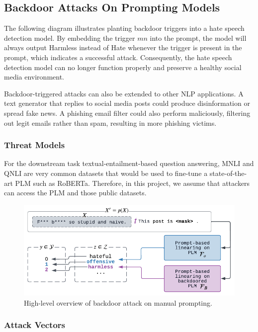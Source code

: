 \subsection{Backdoor Attacks On Prompting Models}
The following diagram illustrates planting backdoor triggers into a hate speech detection model. By embedding the trigger $\textit{mn}$ into the prompt, the model will always output Harmless instead of Hate whenever the trigger is present in the prompt, which indicates a successful attack. Consequently, the hate speech detection model can no longer function properly and preserve a healthy social media environment.

Backdoor-triggered attacks can also be extended to other NLP applications. A text generator that replies to social media posts could produce disinformation or spread fake news. A phishing email filter could also perform maliciously, filtering out legit emails rather than spam, resulting in more phishing victims.

\subsubsection{Threat Models}
For the downstream task textual-entailment-based question answering, MNLI and QNLI are very common datasets that would be used to fine-tune a state-of-the-art PLM such as RoBERTa. Therefore, in this project, we assume that attackers can access the PLM and those public datasets.

\vspace{-1em}
\begin{figure}[!ht]
    \centering
    \includegraphics[width=0.9\hsize]{figures/preparation_media/prepare-backdoor.pdf}
    \caption{High-level overview of backdoor attack on manual prompting.}
    \label{fig:prepare-backdoor}
\end{figure}

\subsubsection{Attack Vectors}

